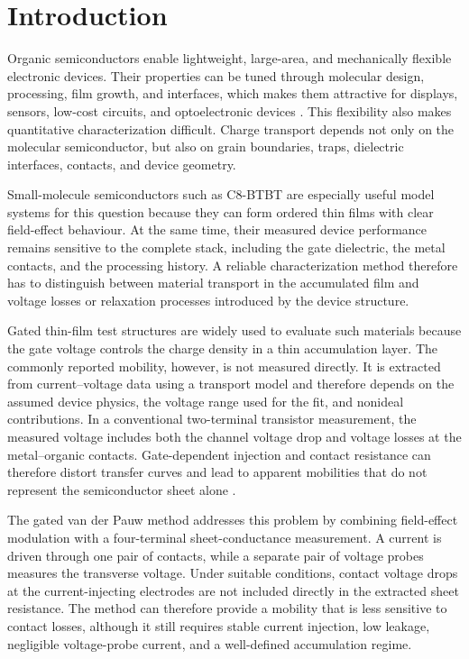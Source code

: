 \section{Introduction}
\label{sec:introduction}

Organic semiconductors enable lightweight, large-area, and mechanically flexible
electronic devices. Their properties can be tuned through molecular design,
processing, film growth, and interfaces, which makes them attractive for displays,
sensors, low-cost circuits, and optoelectronic devices
\cite{Bruetting2005,Sirringhaus2005DevicePhysics}. This flexibility also makes
quantitative characterization difficult. Charge transport depends not only on the
molecular semiconductor, but also on grain boundaries, traps, dielectric
interfaces, contacts, and device geometry.

Small-molecule semiconductors such as C8-BTBT are especially useful model
systems for this question because they can form ordered thin films with clear
field-effect behaviour. At the same time, their measured device performance
remains sensitive to the complete stack, including the gate dielectric, the
metal contacts, and the processing history. A reliable characterization method
therefore has to distinguish between material transport in the accumulated film
and voltage losses or relaxation processes introduced by the device structure.

Gated thin-film test structures are widely used to evaluate such materials
because the gate voltage controls the charge density in a thin accumulation
layer. The commonly reported mobility, however, is not measured
directly. It is extracted from current--voltage data using a transport model and
therefore depends on the assumed device physics, the voltage range used for the
fit, and nonideal contributions. In a conventional two-terminal transistor measurement, the measured voltage
includes both the channel voltage drop and voltage losses at the metal--organic
contacts. Gate-dependent injection and contact resistance can
therefore distort transfer curves and lead to apparent mobilities that do not
represent the semiconductor sheet alone \cite{Natali2012ChargeInjection,
Bittle2016MobilityOverestimation}.

The gated van der Pauw method addresses this problem by combining field-effect
modulation with a four-terminal sheet-conductance measurement. A current is
driven through one pair of contacts, while a separate pair of voltage probes
measures the transverse voltage. Under suitable conditions, contact voltage drops
at the current-injecting electrodes are not included directly in the extracted
sheet resistance. The method can therefore provide a mobility that is less
sensitive to contact losses, although it still requires stable current injection,
low leakage, negligible voltage-probe current, and a well-defined accumulation
regime.

